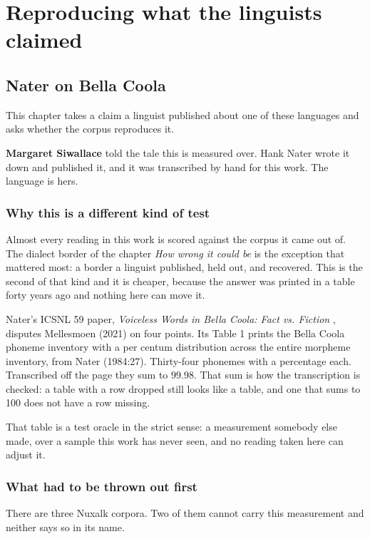 \chapter{Reproducing what the linguists claimed}

\section{Nater on Bella Coola}

This chapter takes a claim a linguist published about one of these languages and asks whether
the corpus reproduces it.

\textbf{Margaret Siwallace} told the tale this is measured over. Hank Nater wrote it down and
published it, and it was transcribed by hand for this work. The language is hers.

\subsection{Why this is a different kind of test}

Almost every reading in this work is scored against the corpus it came out of. The dialect border
of the chapter \emph{How wrong it could be} is the exception that mattered most: a border a linguist
published, held out, and recovered. This is the second of that kind and it is cheaper, because the
answer was printed in a table forty years ago and nothing here can move it.

Nater's ICSNL 59 paper, \emph{Voiceless Words in Bella Coola: Fact vs. Fiction} \cite{src:Nater-2024}, disputes Mellesmoen
(2021) on four points. Its Table 1 prints the Bella Coola phoneme inventory with a per centum
distribution across the entire morpheme inventory, from Nater (1984:27). Thirty-four phonemes with
a percentage each. Transcribed off the page they sum to 99.98. That sum is how the transcription is
checked: a table with a row dropped still looks like a table, and one that sums to 100 does not have
a row missing.

That table is a test oracle in the strict sense: a measurement somebody else made,
over a sample this work has never seen, and no reading taken here can adjust it.

\subsection{What had to be thrown out first}

There are three Nuxalk corpora. Two of them cannot
carry this measurement and neither says so in its name.

